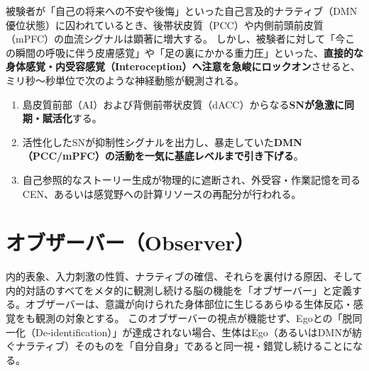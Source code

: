被験者が「自己の将来への不安や後悔」といった自己言及的ナラティブ（DMN優位状態）に囚われているとき、後帯状皮質（PCC）や内側前頭前皮質（mPFC）の血流シグナルは顕著に増大する。
しかし、被験者に対して「今この瞬間の呼吸に伴う皮膚感覚」や「足の裏にかかる重力圧」といった、\textbf{直接的な身体感覚・内受容感覚（Interoception）へ注意を急峻にロックオン}させると、ミリ秒〜秒単位で次のような神経動態が観測される。

\begin{enumerate}[label=(\arabic*)]
  \item 島皮質前部（AI）および背側前帯状皮質（dACC）からなる\textbf{SNが急激に同期・賦活化}する。
  \item 活性化したSNが抑制性シグナルを出力し、暴走していた\textbf{DMN（PCC/mPFC）の活動を一気に基底レベルまで引き下げる}。
  \item 自己参照的なストーリー生成が物理的に遮断され、外受容・作業記憶を司るCEN、あるいは感覚野への計算リソースの再配分が行われる。
\end{enumerate}

\section{オブザーバー（Observer）}
内的表象、入力刺激の性質、ナラティブの確信、それらを裏付ける原因、そして内的対話のすべてをメタ的に観測し続ける脳の機能を「オブザーバー」と定義する。オブザーバーは、意識が向けられた身体部位に生じるあらゆる生体反応・感覚をも観測の対象とする。
このオブザーバーの視点が機能せず、Egoとの「脱同一化（De-identification）」が達成されない場合、生体はEgo（あるいはDMNが紡ぐナラティブ）そのものを「自分自身」であると同一視・錯覚し続けることになる。

%
%
%
%

